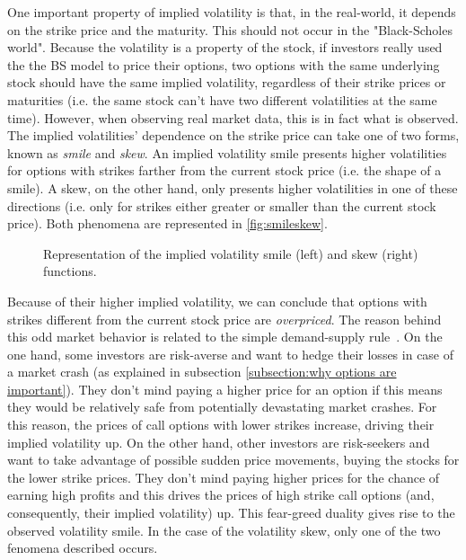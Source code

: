 One important property of implied volatility is that, in the real-world, it depends on the strike price and the maturity. This should not occur in the "Black-Scholes world". Because the volatility is a property of the stock, if investors really used the the BS model to price their options, two options with the same underlying stock should have the same implied volatility, regardless of their strike prices or maturities (i.e. the same stock can't have two different volatilities at the same time).
However, when observing real market data, this is in fact what is observed.
The implied volatilities' dependence on the strike price can take one of two forms, known as \emph{smile} and \emph{skew}.
An implied volatility smile presents higher volatilities for options with strikes farther from the current stock price (i.e. the shape of a smile). A skew, on the other hand, only presents higher volatilities in one of these directions (i.e. only for strikes either greater or smaller than the current stock price). Both phenomena are represented in \autoref{fig:smileskew}.
\begin{figure}[!htb]
  \begin{subfigmatrix}{2}
  \end{subfigmatrix}
  \caption[Representation of the implied volatility smile and skew functions.]{Representation of the implied volatility smile (left) and skew (right) functions.}
  \label{fig:smileskew}
\end{figure}


Because of their higher implied volatility, we can conclude that options with strikes different from the current stock price are \emph{overpriced}.
The reason behind this odd market behavior is related to the simple demand-supply rule~\cite{Wilmott3}. On the one hand, some investors are risk-averse and want to hedge their losses in case of a market crash (as explained in subsection \ref{subsection:why options are important}). They don't mind paying a higher price for an option if this means they would be relatively safe from potentially devastating market crashes. For this reason, the prices of call options with lower strikes increase, driving their implied volatility up. On the other hand, other investors are risk-seekers and want to take advantage of possible sudden price movements, buying the stocks for the lower strike prices. They don't mind paying higher prices for the chance of earning high profits and this drives the prices of high strike call options (and, consequently, their implied volatility) up. This fear-greed duality gives rise to the observed volatility smile. 
In the case of the volatility skew, only one of the two fenomena described occurs.




